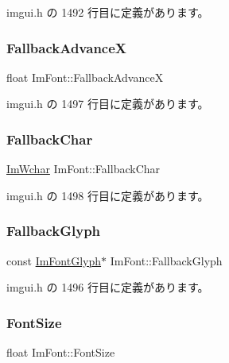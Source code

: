  imgui.\+h の 1492 行目に定義があります。

\mbox{\label{struct_im_font_ad58a5ee4492a3a9fa56f73e5a40d728d}} 
\subsubsection{\texorpdfstring{Fallback\+AdvanceX}{FallbackAdvanceX}}
{\footnotesize\ttfamily float Im\+Font\+::\+Fallback\+AdvanceX}



 imgui.\+h の 1497 行目に定義があります。

\mbox{\label{struct_im_font_ae54c2c4184bfcbc7b8f6da9cbc4f93c0}} 
\subsubsection{\texorpdfstring{Fallback\+Char}{FallbackChar}}
{\footnotesize\ttfamily \mbox{\hyperlink{imgui_8h_af2c7badaf05a0008e15ef76d40875e97}{Im\+Wchar}} Im\+Font\+::\+Fallback\+Char}



 imgui.\+h の 1498 行目に定義があります。

\mbox{\label{struct_im_font_a0e666b0c49646bd294103f4d288df4b8}} 
\subsubsection{\texorpdfstring{Fallback\+Glyph}{FallbackGlyph}}
{\footnotesize\ttfamily const \mbox{\hyperlink{struct_im_font_glyph}{Im\+Font\+Glyph}}$\ast$ Im\+Font\+::\+Fallback\+Glyph}



 imgui.\+h の 1496 行目に定義があります。

\mbox{\label{struct_im_font_a423e36d1594281f1a5a537e5b0d0a3d4}} 
\subsubsection{\texorpdfstring{Font\+Size}{FontSize}}
{\footnotesize\ttfamily float Im\+Font\+::\+Font\+Size}



